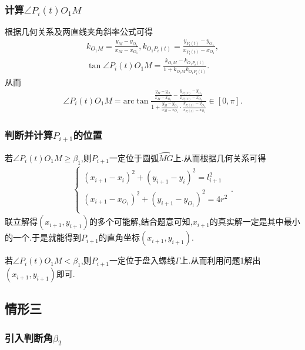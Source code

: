 \documentclass[lang=cn,newtx,10pt,scheme=chinese]{../Template/elegantbook}
\begin{document}
\subsubsection{计算$\angle P_{i}(t)O_1M$}

根据几何关系及两直线夹角斜率公式可得
\begin{gather}
k_{O_1M}=\frac{y_M-y_{O_1}}{x_M-x_{O_1}},k_{O_1P_i\left( t \right)}=\frac{y_{P_i\left( t \right)}-y_{O_1}}{x_{P_i\left( t \right)}-x_{O_1}},
\\
\tan \angle P_i(t)O_1M=\frac{k_{O_1M}-k_{O_1P_i\left( t \right)}}{1+k_{O_1M}k_{O_1P_i\left( t \right)}}.
\end{gather}
从而
\begin{align}
\angle P_i(t)O_1M= \mathrm{arc}\tan \frac{\frac{y_M-y_{O_1}}{x_M-x_{O_1}}-\frac{y_{P_i\left( t \right)}-y_{O_1}}{x_{P_i\left( t \right)}-x_{O_1}}}{1+\frac{y_M-y_{O_1}}{x_M-x_{O_1}}\cdot \frac{y_{P_i\left( t \right)}-y_{O_1}}{x_{P_i\left( t \right)}-x_{O_1}}}\in[0,\pi].
\end{align}


\subsubsection{判断并计算$P_{i+1}$的位置}\label{subsubsection4.4.1.2}

若$\angle P_i(t)O_1M\geq \beta_1$,则$P_{i+1}$一定位于圆弧$\wideparen{MG}$上.从而根据几何关系可得
\begin{align}
\left\{ \begin{array}{c}
\left( x_{i+1}-x_i \right) ^2+\left( y_{i+1}-y_i \right) ^2=l_{i+1}^{2}\\
\left( x_{i+1}-x_{O_1} \right) ^2+\left( y_{i+1}-y_{O_1} \right) ^2=4r^2\\
\end{array} \right. .
\end{align}
联立解得$(x_{i+1},y_{i+1})$的多个可能解,结合题意可知,$x_{i+1}$的真实解一定是其中最小的一个.于是就能得到$P_{i+1}$的直角坐标$(x_{i+1},y_{i+1})$.

若$\angle P_i(t)O_1M< \beta_1$,则$P_{i+1}$一定位于盘入螺线$\varGamma$上.从而利用问题1解出$(x_{i+1},y_{i+1})$即可.

\subsection{情形三}

\subsubsection{引入判断角$\beta_2$}
\end{document}
